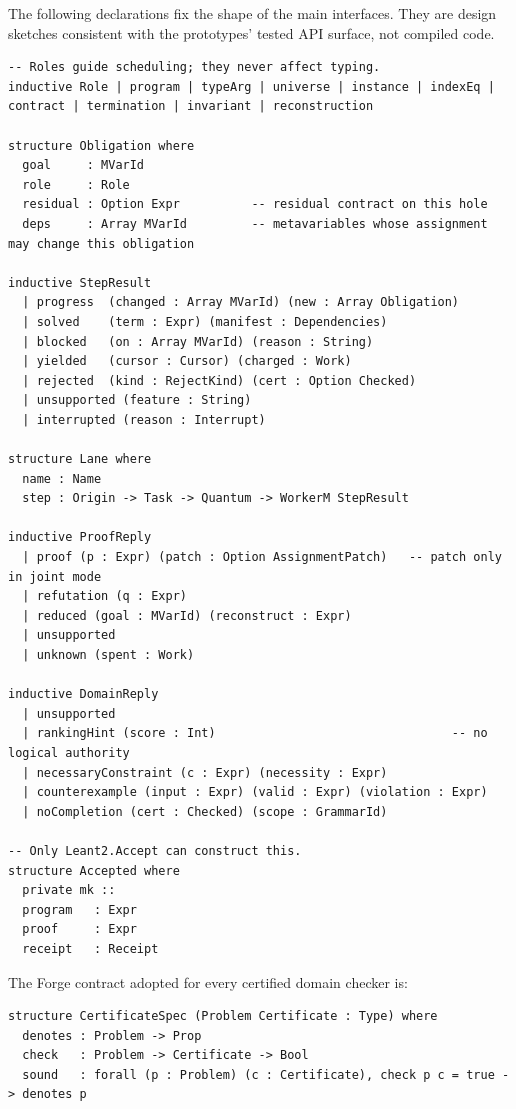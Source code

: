 The following declarations fix the shape of the main interfaces. They are design sketches consistent with the prototypes' tested API surface, not compiled code.

\begin{lstlisting}
-- Roles guide scheduling; they never affect typing.
inductive Role | program | typeArg | universe | instance | indexEq | contract | termination | invariant | reconstruction

structure Obligation where
  goal     : MVarId
  role     : Role
  residual : Option Expr          -- residual contract on this hole
  deps     : Array MVarId         -- metavariables whose assignment may change this obligation

inductive StepResult
  | progress  (changed : Array MVarId) (new : Array Obligation)
  | solved    (term : Expr) (manifest : Dependencies)
  | blocked   (on : Array MVarId) (reason : String)
  | yielded   (cursor : Cursor) (charged : Work)
  | rejected  (kind : RejectKind) (cert : Option Checked)
  | unsupported (feature : String)
  | interrupted (reason : Interrupt)

structure Lane where
  name : Name
  step : Origin -> Task -> Quantum -> WorkerM StepResult

inductive ProofReply
  | proof (p : Expr) (patch : Option AssignmentPatch)   -- patch only in joint mode
  | refutation (q : Expr)
  | reduced (goal : MVarId) (reconstruct : Expr)
  | unsupported
  | unknown (spent : Work)

inductive DomainReply
  | unsupported
  | rankingHint (score : Int)                                 -- no logical authority
  | necessaryConstraint (c : Expr) (necessity : Expr)
  | counterexample (input : Expr) (valid : Expr) (violation : Expr)
  | noCompletion (cert : Checked) (scope : GrammarId)

-- Only Leant2.Accept can construct this.
structure Accepted where
  private mk ::
  program   : Expr
  proof     : Expr
  receipt   : Receipt
\end{lstlisting}

The Forge contract adopted for every certified domain checker is:

\begin{lstlisting}
structure CertificateSpec (Problem Certificate : Type) where
  denotes : Problem -> Prop
  check   : Problem -> Certificate -> Bool
  sound   : forall (p : Problem) (c : Certificate), check p c = true -> denotes p
\end{lstlisting}
